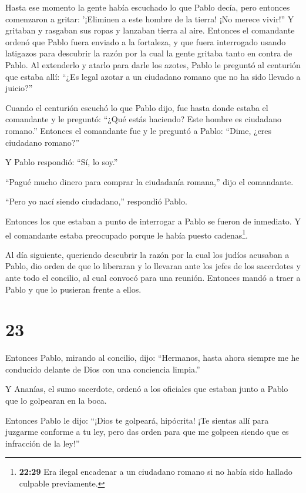  Hasta ese momento la gente había escuchado lo que Pablo
decía, pero entonces comenzaron a gritar: '¡Eliminen a este hombre de la
tierra! ¡No merece vivir!''  Y gritaban y rasgaban sus
ropas y lanzaban tierra al aire.  Entonces el comandante
ordenó que Pablo fuera enviado a la fortaleza, y que fuera interrogado
usando latigazos para descubrir la razón por la cual la gente gritaba
tanto en contra de Pablo.  Al extenderlo y atarlo para
darle los azotes, Pablo le preguntó al centurión que estaba allí: ``¿Es
legal azotar a un ciudadano romano que no ha sido llevado a juicio?''

 Cuando el centurión escuchó lo que Pablo dijo, fue hasta
donde estaba el comandante y le preguntó: ``¿Qué estás haciendo? Este
hombre es ciudadano romano.''  Entonces el comandante fue y
le preguntó a Pablo: ``Dime, ¿eres ciudadano romano?''

Y Pablo respondió: ``Sí, lo soy.''

 ``Pagué mucho dinero para comprar la ciudadanía romana,''
dijo el comandante.

``Pero yo nací siendo ciudadano,'' respondió Pablo.

 Entonces los que estaban a punto de interrogar a Pablo se
fueron de inmediato. Y el comandante estaba preocupado porque le había
puesto cadenas\footnote{\textbf{22:29} Era ilegal encadenar a un
  ciudadano romano si no había sido hallado culpable previamente.}.

 Al día siguiente, queriendo descubrir la razón por la cual
los judíos acusaban a Pablo, dio orden de que lo liberaran y lo llevaran
ante los jefes de los sacerdotes y ante todo el concilio, al cual
convocó para una reunión. Entonces mandó a traer a Pablo y que lo
pusieran frente a ellos.

\hypertarget{section-22}{%
\section{23}\label{section-22}}

 Entonces Pablo, mirando al concilio, dijo: ``Hermanos,
hasta ahora siempre me he conducido delante de Dios con una conciencia
limpia.''

 Y Ananías, el sumo sacerdote, ordenó a los oficiales que
estaban junto a Pablo que lo golpearan en la boca.

 Entonces Pablo le dijo: ``¡Dios te golpeará, hipócrita! ¡Te
sientas allí para juzgarme conforme a tu ley, pero das orden para que me
golpeen siendo que es infracción de la ley!''

